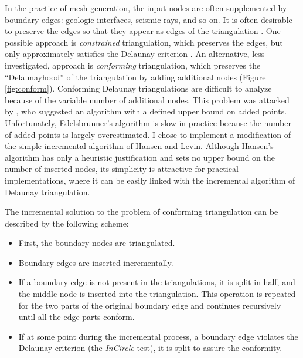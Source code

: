 
In the practice of mesh generation, the input nodes are often
supplemented by boundary edges: geologic interfaces, seismic rays, and
so on. It is often desirable to preserve the edges so that they appear
as edges of the triangulation \cite[]{SEG-1994-0502}. One possible approach is
\emph{constrained} triangulation, which preserves the edges, but only
approximately satisfies the Delaunay criterion \cite[]{lee,chew}. An
alternative, less investigated, approach is \emph{conforming}
triangulation, which preserves the ``Delaunayhood'' of the
triangulation by adding additional nodes \cite[]{hansen} (Figure
\ref{fig:conform}).  Conforming Delaunay triangulations are difficult
to analyze because of the variable number of additional nodes. This
problem was attacked by \cite{edels}, who suggested an algorithm
with a defined upper bound on added points. Unfortunately,
Edelsbrunner's algorithm is slow in practice because the number of
added points is largely overestimated.  I chose to implement a
modification of the simple incremental algorithm of Hansen and Levin.
Although Hansen's algorithm has only a heuristic justification and
sets no upper bound on the number of inserted nodes, its simplicity is
attractive for practical implementations, where it can be easily
linked with the incremental algorithm of Delaunay triangulation.
\par
The incremental solution to the problem of conforming triangulation
can be described by the following scheme:
 \begin{itemize}
 \item First, the boundary nodes are triangulated.
 \item Boundary edges are inserted incrementally.
 \item If a boundary edge is not present in the triangulations, it is
   split in half, and the middle node is inserted into the triangulation. This
   operation is repeated for the two parts of the original boundary
   edge and continues recursively until all the edge parts 
   conform.
 \item If at some point during the incremental process, a boundary edge
   violates the Delaunay criterion (the \emph{InCircle} test), it is
   split to assure the conformity.
 \end{itemize}

